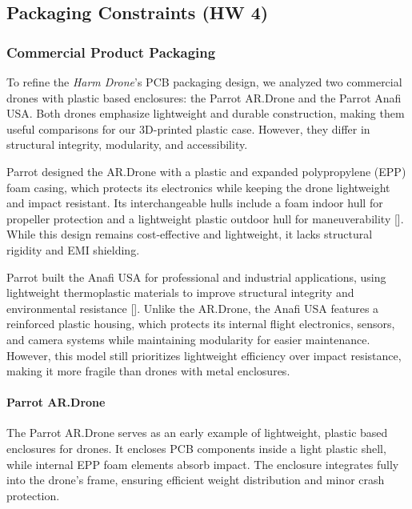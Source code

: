 \documentclass[12pt]{article}
\begin{document}
\subsection{Packaging Constraints (HW 4)}
\subsubsection{Commercial Product Packaging}

\par To refine the \textit{Harm Drone}’s PCB packaging design, we analyzed two commercial drones with plastic based enclosures: the Parrot AR.Drone and the Parrot Anafi USA. Both drones emphasize lightweight and durable construction, making them useful comparisons for our 3D-printed plastic case. However, they differ in structural integrity, modularity, and accessibility.

\par Parrot designed the AR.Drone with a plastic and expanded polypropylene (EPP) foam casing, which protects its electronics while keeping the drone lightweight and impact resistant. Its interchangeable hulls include a foam indoor hull for propeller protection and a lightweight plastic outdoor hull for maneuverability []. While this design remains cost-effective and lightweight, it lacks structural rigidity and EMI shielding.

\par Parrot built the Anafi USA for professional and industrial applications, using lightweight thermoplastic materials to improve structural integrity and environmental resistance []. Unlike the AR.Drone, the Anafi USA features a reinforced plastic housing, which protects its internal flight electronics, sensors, and camera systems while maintaining modularity for easier maintenance. However, this model still prioritizes lightweight efficiency over impact resistance, making it more fragile than drones with metal enclosures.

\paragraph{Parrot AR.Drone}

\par The Parrot AR.Drone serves as an early example of lightweight, plastic based enclosures for drones. It encloses PCB components inside a light plastic shell, while internal EPP foam elements absorb impact. The enclosure integrates fully into the drone’s frame, ensuring efficient weight distribution and minor crash protection.
\end{document}

